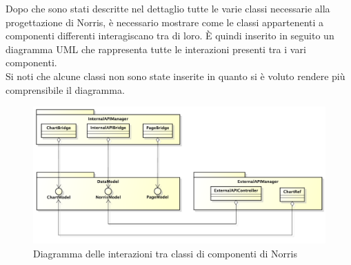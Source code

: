 	Dopo che sono stati descritte nel dettaglio tutte le varie classi necessarie alla progettazione di Norris, è necessario mostrare come le classi appartenenti a componenti differenti interagiscano tra di loro. È quindi inserito in seguito un diagramma UML che rappresenta tutte le interazioni presenti tra i vari componenti.\\
	Si noti che alcune classi non sono state inserite in quanto si è voluto rendere più comprensibile il diagramma.
	\begin{figure}[H]\centering
		\includegraphics[width=\textwidth]{SpecificaTecnica/Pics/InterazioniComponentiNorris.pdf}
		\caption{Diagramma delle interazioni tra classi di componenti di Norris}
	\end{figure}
